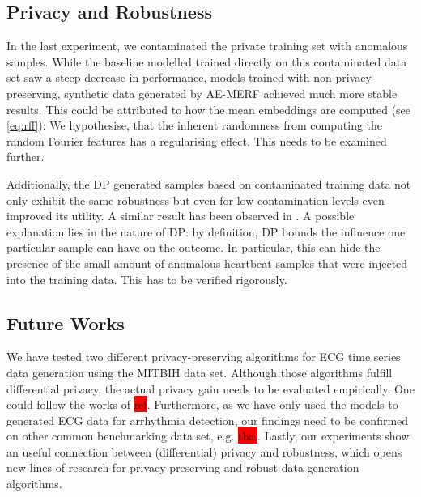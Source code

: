 \subsection{Privacy and Robustness}
In the last experiment, we contaminated the private training set with anomalous samples. While the baseline modelled trained directly on this contaminated data set saw a steep decrease in performance, models trained with non-privacy-preserving, synthetic data generated by AE-MERF achieved much more stable results. This could be attributed to how the mean embeddings are computed (see \cref{eq:rff}): We hypothesise, that the inherent randomness from computing the random Fourier features has a regularising effect. This needs to be examined further.

Additionally, the DP generated samples based on contaminated training data not only exhibit the same robustness but even for low contamination levels even improved its utility. A similar result has been observed in \parencite{du2019robust}. A possible explanation lies in the nature of DP: by definition, DP bounds the influence one particular sample can have on the outcome. In particular, this can hide the presence of the small amount of anomalous heartbeat samples that were injected into the training data. This has to be verified rigorously.


\subsection{Future Works}

We have tested two different privacy-preserving algorithms for ECG time series data generation using the MITBIH data set. Although those algorithms fulfill differential privacy, the actual privacy gain needs to be evaluated empirically. One could follow the works of \colorbox{red}{ref}. 
Furthermore, as we have only used the models to generated ECG data for arrhythmia detection, our findings need to be confirmed on other common benchmarking data set, e.g. \colorbox{red}{tba.}.
Lastly, our experiments show an useful connection between (differential) privacy and robustness, which opens new lines of research for privacy-preserving and robust data generation algorithms.

